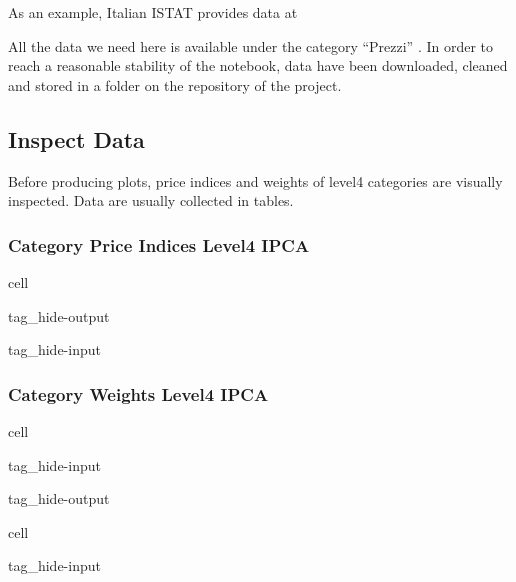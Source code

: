 \documentclass[letterpaper,10pt,english]{jupyterBook}
\begin{document}
\sphinxAtStartPar
{} As an example, Italian ISTAT provides data at 

\sphinxAtStartPar
All the data we need here is available under the category “Prezzi” \sphinxhyphen{} . In order to reach a reasonable stability of the notebook, data have been downloaded, cleaned and stored in a folder on the repository of the project.


\subsection{Inspect Data}
\label{\detokenize{code/notebooks/inflation:inspect-data}}\label{\detokenize{code/notebooks/inflation:fin-edu-inflation-ipca-inspect-data}}
\sphinxAtStartPar
Before producing plots, price indices and weights of level\sphinxhyphen{}4 categories are visually inspected. Data are usually collected in tables.


\subsubsection{Category Price Indices \sphinxhyphen{} Level\sphinxhyphen{}4 IPCA}
\label{\detokenize{code/notebooks/inflation:category-price-indices-level-4-ipca}}\label{\detokenize{code/notebooks/inflation:fin-edu-inflation-ipca-inspect-data-prices}}
\begin{sphinxuseclass}{cell}
\begin{sphinxuseclass}{tag_hide-output}
\begin{sphinxuseclass}{tag_hide-input}
\end{sphinxuseclass}
\end{sphinxuseclass}
\end{sphinxuseclass}

\subsubsection{Category Weights \sphinxhyphen{} Level\sphinxhyphen{}4 IPCA}
\label{\detokenize{code/notebooks/inflation:category-weights-level-4-ipca}}\label{\detokenize{code/notebooks/inflation:fin-edu-inflation-ipca-inspect-data-weights}}
\begin{sphinxuseclass}{cell}
\begin{sphinxuseclass}{tag_hide-input}
\begin{sphinxuseclass}{tag_hide-output}
\end{sphinxuseclass}
\end{sphinxuseclass}
\end{sphinxuseclass}
\begin{sphinxuseclass}{cell}
\begin{sphinxuseclass}{tag_hide-input}
\end{sphinxuseclass}
\end{sphinxuseclass}
\end{document}
